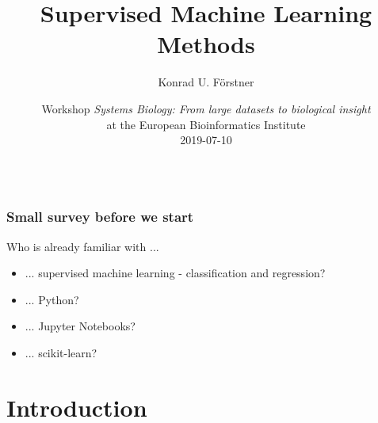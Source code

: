 \documentclass[aspectratio=169]{beamer}
\title{Supervised Machine Learning Methods}
\author{\small Konrad U. Förstner}
\institute{ZB MED -- Information Centre for Life Science \& TH Köln}
\date{\scriptsize 
  Workshop \textit{Systems Biology: From large datasets to biological insight}\\
  at the European Bioinformatics Institute\\
  2019-07-10\\\ \\
}
\begin{document}

\begin{frame}{}
  \titlepage
\end{frame}
\logo{}

\begin{frame}{}
  \frametitle{Small survey before we start}

  \begin{block}{}
    \begin{center}    
      Who is already familiar with ...
      \begin{itemize}
      \item ... supervised machine learning -
        classification and regression?
      \item ... Python?
      \item ... Jupyter Notebooks?
      \item ... scikit-learn?
      \end{itemize}
    \end{center}
  \end{block}

\end{frame}

\setcounter{tocdepth}{1}
\begin{frame}{}
   \tableofcontents
\end{frame}

\section{Introduction}

\begin{frame}{}
   \tableofcontents[currentsection]
\end{frame}
\end{document}

